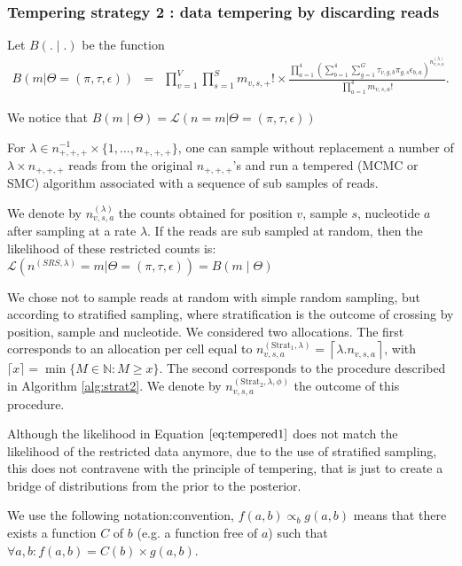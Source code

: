 \documentclass{article}
\begin{document}
\subsubsection{Tempering strategy 2 : data tempering by discarding reads}

Let $B(.\mid.)$ be the function 
\begin{eqnarray}
    B\left(m|\Theta=(\pi, \tau,\epsilon) \right) &=& \prod_{v=1}^{V} \prod_{s = 1}^{S} m_{v,s,+}!\times\frac{\prod_{a = 1}^{4} \left(\sum_{b=1}^{4} \sum_{g = 1}^{G} \tau_{v,g,b} \pi_{g,s} \epsilon_{b,a} \right)^{n_{v,s,a}^{(\lambda)}}}{\prod_{a = 1}^{4}m_{v,s,a}!}. \label{eq:tempered1}
\end{eqnarray}

We notice that $B(m\mid \Theta)=\mathcal{L}\left(n=m | \Theta=(\pi, \tau,\epsilon) \right)$

For $\lambda\in n_{+,+,+}^{-1}\times \{1,\ldots,n_{+,+,+}\}$, one can sample without replacement a number of $\lambda \times n_{+,+,+}$ reads from the original $n_{+,+,+}$'s and run a tempered (MCMC or SMC) algorithm associated with a sequence of sub samples of reads.

We denote by $n_{v,s,a}^{(\lambda)}$ the counts obtained for position $v$, sample $s$, nucleotide $a$ after sampling at a rate $\lambda$.
If the reads are sub sampled at random, then the likelihood of these restricted counts is:
  $\mathcal{L}\left(n^{(SRS,\lambda)}=m | \Theta=(\pi, \tau,\epsilon) \right)=B(m\mid \Theta)$


We chose not  to sample reads at random with simple random sampling, but according to stratified sampling, where stratification is the outcome of crossing by position, sample and nucleotide.
We considered two allocations. The first corresponds to an allocation per cell equal to $n_{v,s,a}^{(\mathrm{Strat}_1,\lambda)}=\left\lceil \lambda. n_{v,s,a}\right\rceil$, 
with $\lceil x\rceil=\min\{M\in\mathbb{N} : M\geq x\}$. 
The second corresponds to the procedure described in Algorithm \ref{alg:strat2}.
We denote by $n_{v,s,a}^{(\mathrm{Strat}_2,\lambda,\phi)}$ the outcome of this procedure.

Although the likelihood in Equation $\ref{eq:tempered1}$ does not match the likelihood of the restricted data anymore, due to the use of stratified sampling, this does not contravene with the principle of tempering, that is just to create a bridge of distributions from the prior to the posterior. 


We use the following notation:convention, $f(a, b)\propto_b g(a,b)$ means that there exists a function $C$ of $b$ (e.g. a function free of $a$) such that $\forall a,b: f(a,b)=C(b)\times g(a,b)$.
\end{document}
